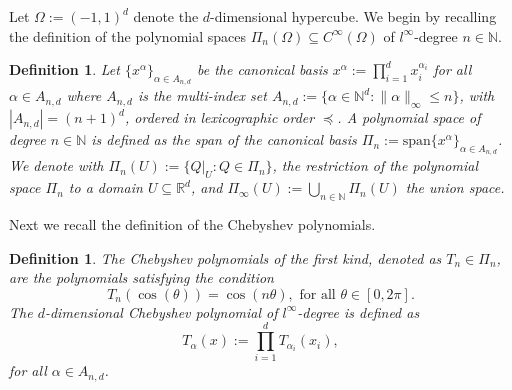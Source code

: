 \documentclass[pdflatex]{sn-jnl}%
\newtheorem{definition}[theorem]{Definition}
\begin{document}
Let $\Omega := (-1,1)^d$ denote the $d$-dimensional hypercube. We begin by recalling the definition of the polynomial spaces $\Pi_{n}(\Omega) \subseteq C^{\infty}(\Omega)$ of $l^\infty$-degree $n \in \mathbb{N}$.
\begin{definition}\label{def:pol}
    Let $\{x^\alpha\}_{\alpha \in A_{n,d}}$ be the \emph{canonical basis} $x^\alpha:= \prod\limits_{i=1}^d x_i^{\alpha_i}$ for all $\alpha\in A_{n,d}$ where $A_{n,d}$ is the multi-index set $A_{n,d}:=\{\alpha \in \mathbb{N}^d:\|\alpha\|_{\infty}\leq n\}$, with $|A_{n,d}| = (n+1)^d$, ordered in \emph{lexicographic order} $\preceq$. A \emph{polynomial space of degree $n\in \mathbb{N}$} is defined as the span of the \emph{canonical basis} $\Pi_{n}:=\mathrm{span}\{x^\alpha\}_{\alpha\in A_{n,d}}$. We denote with $\Pi_{n}(U):=\{Q|_{U}:Q\in \Pi_{n}\}$, the restriction of the polynomial space $\Pi_n$ to a domain $U\subseteq \mathbb{R}^d$, and $\Pi_\infty(U):=\bigcup\limits_{n\in \mathbb{N}}\Pi_n(U)$ the union space.
\end{definition}
Next we recall the definition of the Chebyshev polynomials.
\begin{definition}
 The \emph{Chebyshev polynomials of the first kind}, denoted as $T_n\in \Pi_{n}$, are the polynomials satisfying the condition
    \begin{equation}
        T_n(\cos(\theta)) = \cos(n\theta), \textrm{ for all }\theta\in [0,2\pi]. 
    \end{equation}
    The \emph{$d$-dimensional Chebyshev polynomial of $l^\infty$-degree} is defined as
    \begin{equation}
        T_\alpha(x) := \prod\limits_{i=1}^{d}T_{\alpha_i}(x_i),
    \end{equation}
    for all $\alpha\in A_{n,d}$.
\end{definition}
\end{document}
